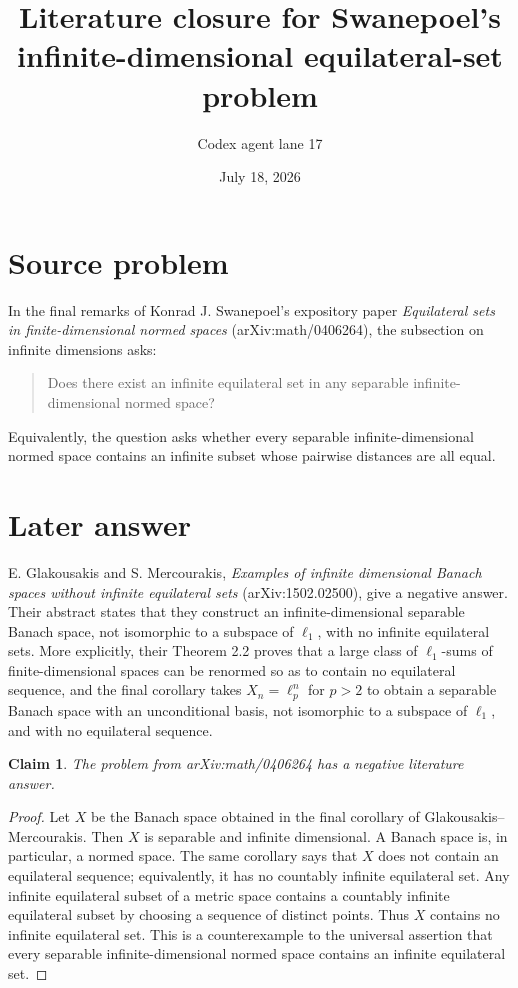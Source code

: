 \documentclass[11pt]{article}
\title{Literature closure for Swanepoel's infinite-dimensional equilateral-set problem}
\author{Codex agent lane 17}
\date{July 18, 2026}
\newtheorem*{claim}{Claim}
\begin{document}
\maketitle

\section*{Source problem}

In the final remarks of Konrad J. Swanepoel's expository paper
\emph{Equilateral sets in finite-dimensional normed spaces}
(arXiv:math/0406264), the subsection on infinite dimensions asks:
\begin{quote}
Does there exist an infinite equilateral set in any separable
infinite-dimensional normed space?
\end{quote}
Equivalently, the question asks whether every separable
infinite-dimensional normed space contains an infinite subset whose
pairwise distances are all equal.

\section*{Later answer}

E. Glakousakis and S. Mercourakis,
\emph{Examples of infinite dimensional Banach spaces without infinite
equilateral sets} (arXiv:1502.02500), give a negative answer.  Their
abstract states that they construct an infinite-dimensional separable
Banach space, not isomorphic to a subspace of $\ell_1$, with no infinite
equilateral sets.  More explicitly, their Theorem 2.2 proves that a
large class of $\ell_1$-sums of finite-dimensional spaces can be
renormed so as to contain no equilateral sequence, and the final
corollary takes $X_n=\ell_p^n$ for $p>2$ to obtain a separable Banach
space with an unconditional basis, not isomorphic to a subspace of
$\ell_1$, and with no equilateral sequence.

\begin{claim}
The problem from arXiv:math/0406264 has a negative literature answer.
\end{claim}

\begin{proof}
Let $X$ be the Banach space obtained in the final corollary of
Glakousakis--Mercourakis.  Then $X$ is separable and infinite
dimensional.  A Banach space is, in particular, a normed space.  The
same corollary says that $X$ does not contain an equilateral sequence;
equivalently, it has no countably infinite equilateral set.  Any
infinite equilateral subset of a metric space contains a countably
infinite equilateral subset by choosing a sequence of distinct points.
Thus $X$ contains no infinite equilateral set.  This is a counterexample
to the universal assertion that every separable infinite-dimensional
normed space contains an infinite equilateral set.
\end{proof}
\end{document}
